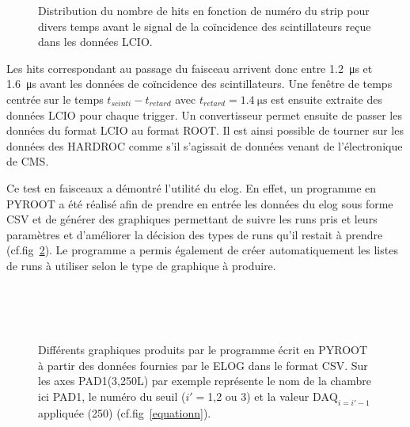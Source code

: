 \begin{figure}[ht!]
	\hfill
	\caption{Distribution du nombre de hits en fonction de numéro du strip pour divers temps avant le signal de la coïncidence des scintillateurs reçue dans les données LCIO.}
	\label{decalage}
\end{figure}  

Les hits correspondant au passage du faisceau arrivent donc entre  \SI{1.2}{\micro\second} et \SI{1.6}{\micro\second} avant les données de coïncidence des scintillateurs. Une fenêtre de temps centrée sur le temps $t_{scinti}-t_{retard}$ avec $t_{retard}=\SI{1.4}{\micro\second}$ est ensuite extraite des données LCIO pour chaque trigger. Un convertisseur permet ensuite de passer les données du format LCIO au format ROOT. Il est ainsi possible de tourner sur les données des HARDROC comme s'il s'agissait de données venant de l'électronique de CMS.

Ce test en faisceaux a démontré l'utilité du elog. En effet, un programme en PYROOT a été réalisé afin de prendre en entrée les données du elog sous forme CSV et de générer des graphiques permettant de suivre les runs pris et leurs paramètres et d'améliorer la décision des types de runs qu'il restait à prendre (cf.fig~\ref{elogutil}). Le programme a permis également de créer automatiquement les listes de runs à utiliser selon le type de graphique à produire. 

\begin{figure}[ht!]
	\centering
	\\
	\\
	\\
	\caption{Différents graphiques produits par le programme écrit en PYROOT à partir des données fournies par le ELOG dans le format CSV. Sur les axes PAD1(3,250L) par exemple représente le nom de la chambre ici PAD1, le numéro du seuil ($i'=$1,2 ou 3) et la valeur $\mbox{DAQ}_{i=i'-1}$ appliquée (250) (cf.fig~\ref{equationn}).}
	\label{elogutil}	
\end{figure}

